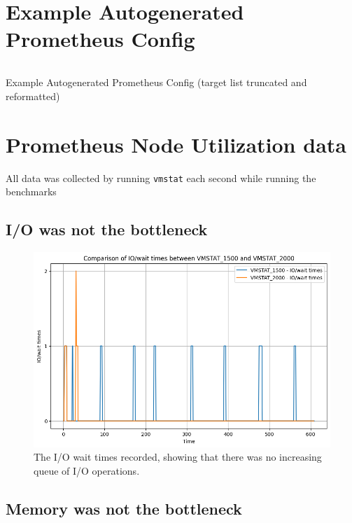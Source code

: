 \section{Example Autogenerated Prometheus Config}
\begin{listing}[H]
  \inputminted{yaml}{./prom.yml}
\caption{Example Autogenerated Prometheus Config (target list truncated and reformatted)}
\end{listing}
\section{Prometheus Node Utilization data}
All data was collected by running \texttt{vmstat} each second while running the benchmarks

\subsection{I/O was not the bottleneck}
\begin{figure}[H]
  \centering
  \includegraphics[width=\textwidth]{./plots/p1_iowait.png}
  \caption{The I/O wait times recorded, showing that there was no increasing queue of I/O operations.}
\end{figure}

\subsection{Memory was not the bottleneck}

